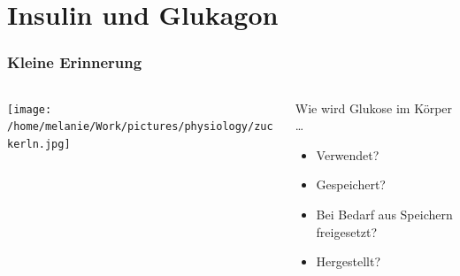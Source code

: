 \documentclass{beamer}
\begin{document}

\section{Insulin und Glukagon}


\begin{frame}
\frametitle{Kleine Erinnerung}

\begin{columns}[c]

\begin{column}{5cm}
\begin{center}
\texttt{[image: /home/melanie/Work/pictures/physiology/zuckerln.jpg]}
\end{center}
\end{column}

\begin{column}{5cm}

Wie wird Glukose im Körper \dots

\begin{itemize}
\item
Verwendet?
\item
Gespeichert?
\item
Bei Bedarf aus Speichern freigesetzt?
\item
Hergestellt?
\end{itemize}


\end{column}


\end{columns}



\end{frame}
\end{document}
